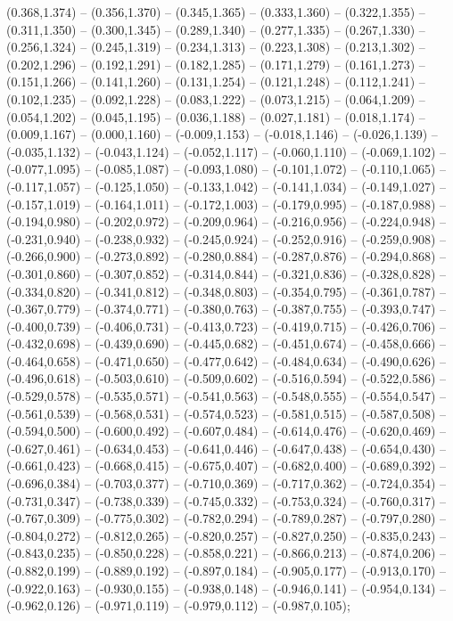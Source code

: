 (0.368,1.374) -- (0.356,1.370) -- (0.345,1.365) -- (0.333,1.360) -- (0.322,1.355) -- (0.311,1.350) -- (0.300,1.345) -- (0.289,1.340) -- (0.277,1.335) -- (0.267,1.330) -- (0.256,1.324) -- (0.245,1.319) -- (0.234,1.313) -- (0.223,1.308) -- (0.213,1.302) -- (0.202,1.296) -- (0.192,1.291) -- (0.182,1.285) -- (0.171,1.279) -- (0.161,1.273) -- (0.151,1.266) -- (0.141,1.260) -- (0.131,1.254) -- (0.121,1.248) -- (0.112,1.241) -- (0.102,1.235) -- (0.092,1.228) -- (0.083,1.222) -- (0.073,1.215) -- (0.064,1.209) -- (0.054,1.202) -- (0.045,1.195) -- (0.036,1.188) -- (0.027,1.181) -- (0.018,1.174) -- (0.009,1.167) -- (0.000,1.160) -- (-0.009,1.153) -- (-0.018,1.146) -- (-0.026,1.139) -- (-0.035,1.132) -- (-0.043,1.124) -- (-0.052,1.117) -- (-0.060,1.110) -- (-0.069,1.102) -- (-0.077,1.095) -- (-0.085,1.087) -- (-0.093,1.080) -- (-0.101,1.072) -- (-0.110,1.065) -- (-0.117,1.057) -- (-0.125,1.050) -- (-0.133,1.042) -- (-0.141,1.034) -- (-0.149,1.027) -- (-0.157,1.019) -- (-0.164,1.011) -- (-0.172,1.003) -- (-0.179,0.995) -- (-0.187,0.988) -- (-0.194,0.980) -- (-0.202,0.972) -- (-0.209,0.964) -- (-0.216,0.956) -- (-0.224,0.948) -- (-0.231,0.940) -- (-0.238,0.932) -- (-0.245,0.924) -- (-0.252,0.916) -- (-0.259,0.908) -- (-0.266,0.900) -- (-0.273,0.892) -- (-0.280,0.884) -- (-0.287,0.876) -- (-0.294,0.868) -- (-0.301,0.860) -- (-0.307,0.852) -- (-0.314,0.844) -- (-0.321,0.836) -- (-0.328,0.828) -- (-0.334,0.820) -- (-0.341,0.812) -- (-0.348,0.803) -- (-0.354,0.795) -- (-0.361,0.787) -- (-0.367,0.779) -- (-0.374,0.771) -- (-0.380,0.763) -- (-0.387,0.755) -- (-0.393,0.747) -- (-0.400,0.739) -- (-0.406,0.731) -- (-0.413,0.723) -- (-0.419,0.715) -- (-0.426,0.706) -- (-0.432,0.698) -- (-0.439,0.690) -- (-0.445,0.682) -- (-0.451,0.674) -- (-0.458,0.666) -- (-0.464,0.658) -- (-0.471,0.650) -- (-0.477,0.642) -- (-0.484,0.634) -- (-0.490,0.626) -- (-0.496,0.618) -- (-0.503,0.610) -- (-0.509,0.602) -- (-0.516,0.594) -- (-0.522,0.586) -- (-0.529,0.578) -- (-0.535,0.571) -- (-0.541,0.563) -- (-0.548,0.555) -- (-0.554,0.547) -- (-0.561,0.539) -- (-0.568,0.531) -- (-0.574,0.523) -- (-0.581,0.515) -- (-0.587,0.508) -- (-0.594,0.500) -- (-0.600,0.492) -- (-0.607,0.484) -- (-0.614,0.476) -- (-0.620,0.469) -- (-0.627,0.461) -- (-0.634,0.453) -- (-0.641,0.446) -- (-0.647,0.438) -- (-0.654,0.430) -- (-0.661,0.423) -- (-0.668,0.415) -- (-0.675,0.407) -- (-0.682,0.400) -- (-0.689,0.392) -- (-0.696,0.384) -- (-0.703,0.377) -- (-0.710,0.369) -- (-0.717,0.362) -- (-0.724,0.354) -- (-0.731,0.347) -- (-0.738,0.339) -- (-0.745,0.332) -- (-0.753,0.324) -- (-0.760,0.317) -- (-0.767,0.309) -- (-0.775,0.302) -- (-0.782,0.294) -- (-0.789,0.287) -- (-0.797,0.280) -- (-0.804,0.272) -- (-0.812,0.265) -- (-0.820,0.257) -- (-0.827,0.250) -- (-0.835,0.243) -- (-0.843,0.235) -- (-0.850,0.228) -- (-0.858,0.221) -- (-0.866,0.213) -- (-0.874,0.206) -- (-0.882,0.199) -- (-0.889,0.192) -- (-0.897,0.184) -- (-0.905,0.177) -- (-0.913,0.170) -- (-0.922,0.163) -- (-0.930,0.155) -- (-0.938,0.148) -- (-0.946,0.141) -- (-0.954,0.134) -- (-0.962,0.126) -- (-0.971,0.119) -- (-0.979,0.112) -- (-0.987,0.105);
